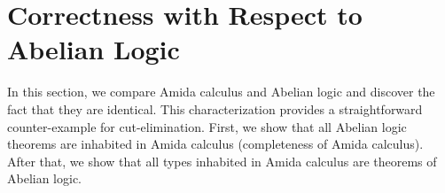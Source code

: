 


\section{Correctness with Respect to Abelian Logic}
\label{correct-abelian}

In this section, we compare Amida calculus and Abelian logic and
discover the fact that they are identical.
This characterization provides a straightforward counter-example for
cut-elimination.
First, we show that all Abelian logic theorems are inhabited in Amida
calculus (completeness of Amida calculus).
After that, we show that all types inhabited in Amida calculus are
theorems of Abelian logic.

